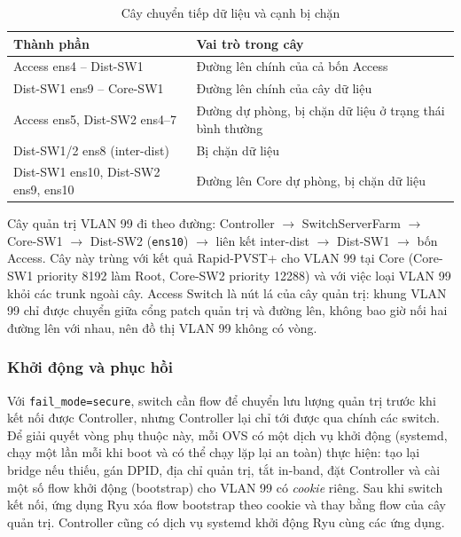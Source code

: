 \begin{table}[H]
    \centering
    \small
    \caption{Cây chuyển tiếp dữ liệu và cạnh bị chặn}
    \label{tab:cay_du_lieu}
    \begin{tabularx}{\textwidth}{|P{4.4cm}|X|}
        \hline
        \textbf{Thành phần} & \textbf{Vai trò trong cây} \\
        \hline
        Access ens4 -- Dist-SW1 & Đường lên chính của cả bốn Access \\
        \hline
        Dist-SW1 ens9 -- Core-SW1 & Đường lên chính của cây dữ liệu \\
        \hline
        Access ens5, Dist-SW2 ens4--7 & Đường dự phòng, bị chặn dữ liệu ở trạng thái bình thường \\
        \hline
        Dist-SW1/2 ens8 (inter-dist) & Bị chặn dữ liệu \\
        \hline
        Dist-SW1 ens10, Dist-SW2 ens9, ens10 & Đường lên Core dự phòng, bị chặn dữ liệu \\
        \hline
    \end{tabularx}
\end{table}

Cây quản trị VLAN 99 đi theo đường: Controller $\rightarrow$ SwitchServerFarm $\rightarrow$ Core-SW1 $\rightarrow$ Dist-SW2 (\texttt{ens10}) $\rightarrow$ liên kết inter-dist $\rightarrow$ Dist-SW1 $\rightarrow$ bốn Access. Cây này trùng với kết quả Rapid-PVST+ cho VLAN 99 tại Core (Core-SW1 priority 8192 làm Root, Core-SW2 priority 12288) và với việc loại VLAN 99 khỏi các trunk ngoài cây. Access Switch là nút lá của cây quản trị: khung VLAN 99 chỉ được chuyển giữa cổng patch quản trị và đường lên, không bao giờ nối hai đường lên với nhau, nên đồ thị VLAN 99 không có vòng.

\subsubsection{Khởi động và phục hồi}

Với \texttt{fail\_mode=secure}, switch cần flow để chuyển lưu lượng quản trị trước khi kết nối được Controller, nhưng Controller lại chỉ tới được qua chính các switch. Để giải quyết vòng phụ thuộc này, mỗi OVS có một dịch vụ khởi động (systemd, chạy một lần mỗi khi boot và có thể chạy lặp lại an toàn) thực hiện: tạo lại bridge nếu thiếu, gán DPID, địa chỉ quản trị, tắt in-band, đặt Controller và cài một số flow khởi động (bootstrap) cho VLAN 99 có \textit{cookie} riêng. Sau khi switch kết nối, ứng dụng Ryu xóa flow bootstrap theo cookie và thay bằng flow của cây quản trị. Controller cũng có dịch vụ systemd khởi động Ryu cùng các ứng dụng.

